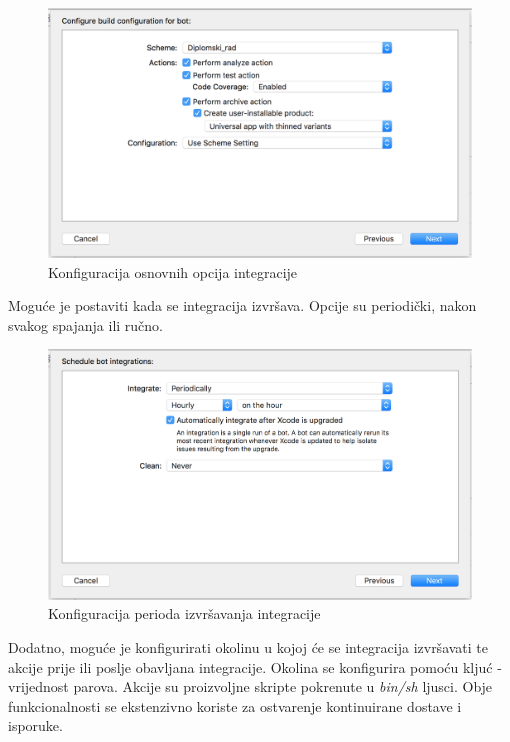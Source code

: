 \documentclass[times, utf8, diplomski, numeric]{fer}
\begin{document}
\begin{appendices}
\begin{figure}
    \centering
    \includegraphics[scale=0.5]{XcodeServerOptions}
    \caption{Konfiguracija osnovnih opcija integracije}
    \label{fig:XcodeServerOptions}
\end{figure}

Moguće je postaviti kada se integracija izvršava. Opcije su periodički, nakon svakog spajanja ili ručno.

\begin{figure}
    \centering
    \includegraphics[scale=0.5]{XcodeServerIntegrationPeriods}
    \caption{Konfiguracija perioda izvršavanja integracije}
    \label{fig:XcodeServerIntegrationPeriods}
\end{figure}

Dodatno, moguće je konfigurirati okolinu u kojoj će se integracija izvršavati te akcije prije ili poslje obavljana integracije. Okolina se konfigurira pomoću kljuć - vrijednost parova. Akcije su proizvoljne skripte pokrenute u \textit{bin/sh} ljusci. Obje funkcionalnosti se ekstenzivno koriste za ostvarenje kontinuirane dostave i isporuke.


\end{appendices}
\end{document}
